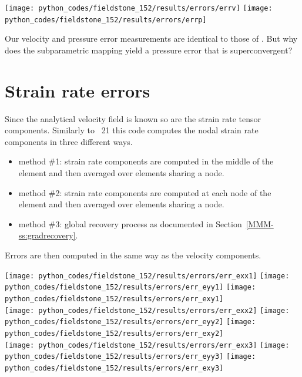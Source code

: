 \begin{center}
\texttt{[image: python\_codes/fieldstone\_152/results/errors/errv]}
\texttt{[image: python\_codes/fieldstone\_152/results/errors/errp]}
\end{center}

Our velocity and pressure error measurements are identical to those of \aspect.
But why does the subparametric mapping yield a pressure error that is superconvergent?


\newpage

\section*{Strain rate errors}

Since the analytical velocity field is known so are the strain rate tensor components.
Similarly to \stone~21 this code computes the nodal strain rate components
in three different ways. 
\begin{itemize}
\item method \#1: strain rate components are computed in the middle of the element and then averaged over elements sharing a node.
\item method \#2: strain rate components are computed at each node of the element and then averaged over elements sharing a node.
\item method \#3: global recovery process as documented in Section~\ref{MMM-ss:gradrecovery}.
\end{itemize}

Errors are then computed in the same way as the velocity components.

\begin{center}
\texttt{[image: python\_codes/fieldstone\_152/results/errors/err\_exx1]}
\texttt{[image: python\_codes/fieldstone\_152/results/errors/err\_eyy1]}
\texttt{[image: python\_codes/fieldstone\_152/results/errors/err\_exy1]}\\
\texttt{[image: python\_codes/fieldstone\_152/results/errors/err\_exx2]}
\texttt{[image: python\_codes/fieldstone\_152/results/errors/err\_eyy2]}
\texttt{[image: python\_codes/fieldstone\_152/results/errors/err\_exy2]}\\
\texttt{[image: python\_codes/fieldstone\_152/results/errors/err\_exx3]}
\texttt{[image: python\_codes/fieldstone\_152/results/errors/err\_eyy3]}
\texttt{[image: python\_codes/fieldstone\_152/results/errors/err\_exy3]}
\end{center}

